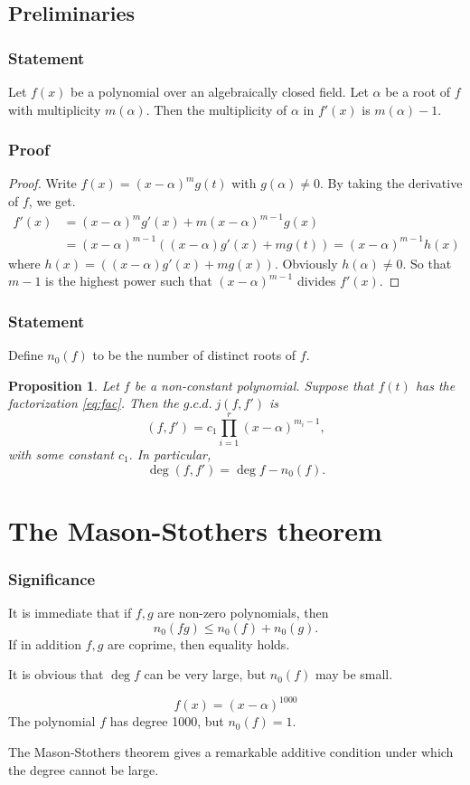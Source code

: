 \documentclass[envcountsect]{beamer}
\newtheorem{prop}{Proposition}
\begin{document}
\begin{frame}
\section{Preliminaries}
\frametitle{Statement}
\begin{lemma}
Let $f(x)$ be a polynomial over an algebraically closed field. Let $\alpha$ be a
root of $f$ with multiplicity $m(\alpha)$. Then the multiplicity of $\alpha$ in
$f'(x)$ is $m(\alpha) - 1.$ 
\end{lemma}
\end{frame}

\begin{frame}
\frametitle{Proof}
\begin{proof}
Write $f(x) = (x-\alpha)^{m}g(t)$ with $g(\alpha) \neq 0.$ By taking the
derivative of $f$, we get.
\begin{align*}
  f'(x) &= (x-\alpha)^mg'(x) + m(x-\alpha)^{m-1}g(x) \\
        &= (x-\alpha)^{m-1}((x-\alpha)g'(x)+mg(t)) = (x-\alpha)^{m-1}h(x)
\end{align*}  
where $h(x) = ((x-\alpha)g'(x)+mg(x))$. Obviously $h(\alpha) \neq 0.$ So that
$m-1$ is the highest power such that $(x-\alpha)^{m-1}$ divides $f'(x).$

\end{proof}
\end{frame}

\begin{frame}
  \frametitle{Statement}
  Define $n_0(f)$ to be the number of distinct roots of $f$.
  \begin{prop}
   Let $f$ be a non-constant polynomial. Suppose that $f(t)$ has the
   factorization \eqref{eq:fac}. Then the $g.c.d. \; j(f,f')$ is
   \[
     (f,f') = c_1\prod_{i=1}^r(x-\alpha)^{m_i-1},
   \]
   with some constant $c_1.$ In particular,
   \[
     \operatorname{deg}(f,f') = \operatorname{deg}f - n_0(f).
   \]
  \end{prop}
\end{frame}

\section{The Mason-Stothers theorem}
\begin{frame}
\frametitle{Significance}

It is immediate that if $f,g$ are non-zero polynomials, then
\[
n_0(fg) \leq n_0(f) + n_0(g).
\]
If in addition $f,g$ are coprime, then equality holds.

It is obvious that $\operatorname{deg} f$ can be very large, but $n_0(f)$ may be
small.

\begin{example}
  \[
f(x) = (x-\alpha)^{1000}
 \]
 The polynomial $f$ has degree 1000, but $n_0(f) = 1.$
\end{example}
The Mason-Stothers theorem gives a remarkable additive condition under which the degree cannot be large.
\end{frame}
\end{document}
